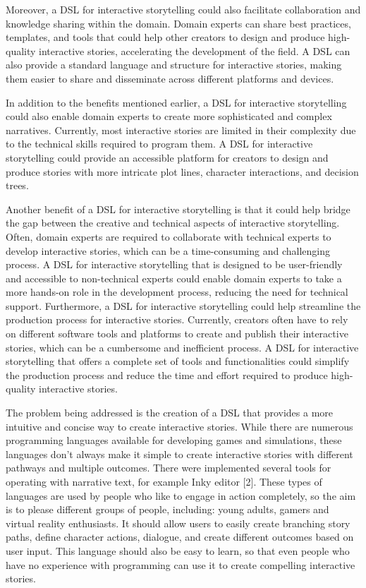Moreover, a DSL for interactive storytelling could also facilitate collaboration and knowledge sharing within the domain. Domain experts can share best practices, templates, and tools that could help other creators to design and produce high-quality interactive stories, accelerating the development of the field. A DSL can also provide a standard language and structure for interactive stories, making them easier to share and disseminate across different platforms and devices.

In addition to the benefits mentioned earlier, a DSL for interactive storytelling could also enable domain experts to create more sophisticated and complex narratives. Currently, most interactive stories are limited in their complexity due to the technical skills required to program them. A DSL for interactive storytelling could provide an accessible platform for creators to design and produce stories with more intricate plot lines, character interactions, and decision trees.

Another benefit of a DSL for interactive storytelling is that it could help bridge the gap between the creative and technical aspects of interactive storytelling. Often, domain experts are required to collaborate with technical experts to develop interactive stories, which can be a time-consuming and challenging process. A DSL for interactive storytelling that is designed to be user-friendly and accessible to non-technical experts could enable domain experts to take a more hands-on role in the development process, reducing the need for technical support.
Furthermore, a DSL for interactive storytelling could help streamline the production process for interactive stories. Currently, creators often have to rely on different software tools and platforms to create and publish their interactive stories, which can be a cumbersome and inefficient process. A DSL for interactive storytelling that offers a complete set of tools and functionalities could simplify the production process and reduce the time and effort required to produce high-quality interactive stories.

The problem being addressed is the creation of a DSL that provides a more intuitive and concise way to create interactive stories. While there are numerous programming languages available for developing games and simulations, these languages don’t always make it simple to create interactive stories with different pathways and multiple outcomes. There were implemented several tools for operating with narrative text, for example Inky editor [2].	
These types of languages are used by people who like to engage in action completely, so the aim is to please different groups of people, including: young adults, gamers and virtual reality enthusiasts. It should allow users to easily create branching story paths, define character actions, dialogue, and create different outcomes based on user input. This language should also be easy to learn, so that even people who have no experience with programming can use it to create compelling interactive stories.


